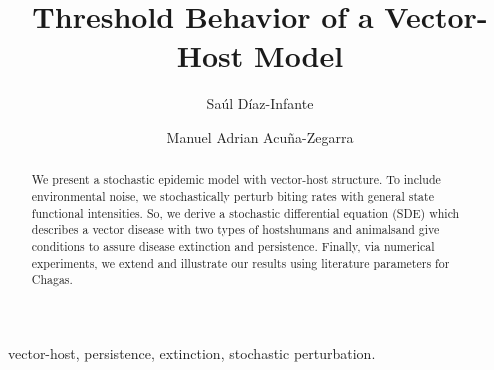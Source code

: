 \begin{frontmatter}
    \title{
        Threshold Behavior  of a Vector-Host Model
    }
    \author[add:conacyt_unison]{%
    Sa\'ul D\'iaz-Infante%
    }%
    \author[add:unison]{%
        Manuel Adrian Acu\~na-Zegarra
    }%
    \address[add:conacyt_unison]{
        CONACYT-Universidad de Sonora, 
        Departamento de Matem\'aticas, Boulevard Luis Encinas y 
        Rosales S/N, 83000, Hermosillo, Sonora, M\'exico.
    }
%
    \address[add:unison]{
        Departamento de Matem\'aticas, Universidad de Sonora, Boulevard
        Luis Encinas y Rosales S/N, Col. Centro, Hermosillo, Sonora, 
        M\'exico.
    }
    \begin{abstract}
        We present a stochastic epidemic model with vector-host structure. To 
        include environmental noise, we stochastically perturb biting rates 
        with general state functional intensities. So, we derive a stochastic 
        differential equation (SDE) which describes a vector disease with two 
        types of hosts\textemdash humans and animals\textemdash and give 
        conditions to assure disease extinction and persistence. Finally, via 
        numerical experiments, we extend and illustrate our results using 
        literature parameters for Chagas.
    \end{abstract}
    \begin{keyword}
        vector-host, persistence, extinction, stochastic perturbation.
    \end{keyword}
\end{frontmatter}